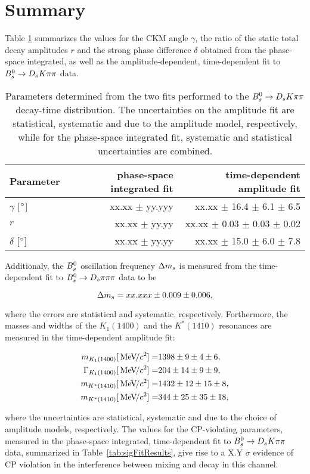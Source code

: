 \section{Summary}
\label{sec:Summary}

Table \ref{tab:ResultSummary} summarizes the values for the CKM angle $\gamma$, the ratio of the static total decay amplitudes $r$ 
and the strong phase difference $\delta$ obtained from the phase-space integrated, as well as the amplitude-dependent, time-dependent fit to ${{B}^0_{s}}\rightarrow{\ensuremath{{D}_{s}}}{\ensuremath{K}}{\ensuremath{\pi}}{\ensuremath{\pi}}$ data.

\begin{table}[h]
\centering
\caption{Parameters determined from the two fits performed to the ${{B}^0_{s}}\rightarrow{\ensuremath{{D}_{s}}}{\ensuremath{K}}{\ensuremath{\pi}}{\ensuremath{\pi}}$ decay-time distribution. 
The uncertainties on the amplitude fit are statistical, systematic and due to the amplitude model, respectively, while for the phase-space integrated fit, systematic and statistical uncertainties are combined.}
\begin{tabular}{l r r }
\hline
\hline
Parameter & phase-space integrated fit & time-dependent amplitude fit \\
\hline
$\gamma$ [$^{\circ}$] & xx.xx $\pm$ yy.yyy  & xx.xx $\pm$ 16.4 $\pm$ 6.1 $\pm$ 6.5 \\
$r$ & xx.xx $\pm$ yy.yy  & xx.xx $\pm$ 0.03 $\pm$ 0.03 $\pm$ 0.02 \\
$\delta$ [$^{\circ}$] & xx.xx $\pm$ yy.yy & xx.xx $\pm$ 15.0 $\pm$ 6.0 $\pm$ 7.8 \\
\hline
\hline
\end{tabular}
\label{tab:ResultSummary}
\end{table}

Additionaly, the ${{B}^0_{s}}$ oscillation frequency ${\Delta m_{{s}}}$ is measured from the time-dependent fit to ${{B}^0_{s}}\rightarrow{\ensuremath{{D}_{s}}}{\ensuremath{\pi}}{\ensuremath{\pi}}{\ensuremath{\pi}}$ data to be

\begin{equation*}
{\ensuremath{\Delta m_{{s}}}} = xx.xxx \pm 0.009 \pm 0.006,  
\end{equation*}

where the errors are statistical and systematic, respectively.\newline
Forthermore, the masses and widths of the $K_{1}(1400)$ and the $K^{*}(1410)$ resonances are measured in the time-dependent amplitude fit:


\begin{align*}
m_{K_{1}(1400)} [{\mathrm{\,Me\kern -0.1em V\!/}c^2}]      = & 1398 \pm 9 \pm 4 \pm 6,   \\
\Gamma_{K_{1}(1400)} [{\mathrm{\,Me\kern -0.1em V\!/}c^2}] = &  204 \pm 14 \pm 9 \pm 9 ,  \\
 m_{K^{*}(1410)} [{\mathrm{\,Me\kern -0.1em V\!/}c^2}]     = &   1432 \pm 12 \pm 15 \pm 8, \\
 m_{K^{*}(1410)} [{\mathrm{\,Me\kern -0.1em V\!/}c^2}]     = &  344 \pm 25 \pm 35 \pm 18,
\end{align*}

where the uncertainties are statistical, systematic and due to the choice of amplitude models, respectively.\newline
The values for the CP-violating parameters, measured in the phase-space integrated, time-dependent fit to ${{B}^0_{s}}\rightarrow{\ensuremath{{D}_{s}}}{\ensuremath{K}}{\ensuremath{\pi}}{\ensuremath{\pi}}$ data, summarized in Table~\ref{tab:sigFitResults}, 
give rise to a X.Y $\sigma$ evidence of CP violation in the interference between mixing and decay in this channel.
